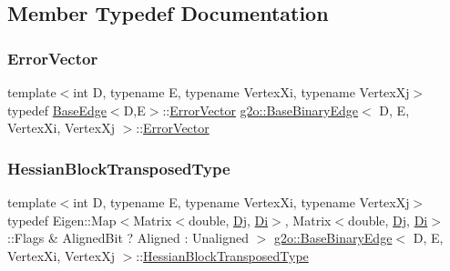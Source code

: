 \subsection{Member Typedef Documentation}
\mbox{\label{classg2o_1_1_base_binary_edge_ae1cccf6068b2446ece316b6a69a46acf}} 
\subsubsection{\texorpdfstring{Error\+Vector}{ErrorVector}}
{\footnotesize\ttfamily template$<$int D, typename E, typename Vertex\+Xi, typename Vertex\+Xj$>$ \\
typedef \mbox{\hyperlink{classg2o_1_1_base_edge}{Base\+Edge}}$<$D,E$>$\+::\mbox{\hyperlink{classg2o_1_1_base_binary_edge_ae1cccf6068b2446ece316b6a69a46acf}{Error\+Vector}} \mbox{\hyperlink{classg2o_1_1_base_binary_edge}{g2o\+::\+Base\+Binary\+Edge}}$<$ D, E, Vertex\+Xi, Vertex\+Xj $>$\+::\mbox{\hyperlink{classg2o_1_1_base_binary_edge_ae1cccf6068b2446ece316b6a69a46acf}{Error\+Vector}}}

\mbox{\label{classg2o_1_1_base_binary_edge_aec0d5b1819f702b7658574fcd6324b49}} 
\subsubsection{\texorpdfstring{Hessian\+Block\+Transposed\+Type}{HessianBlockTransposedType}}
{\footnotesize\ttfamily template$<$int D, typename E, typename Vertex\+Xi, typename Vertex\+Xj$>$ \\
typedef Eigen\+::\+Map$<$Matrix$<$double, \mbox{\hyperlink{classg2o_1_1_base_binary_edge_ab718b94950a34d589371fe6f5583b259}{Dj}}, \mbox{\hyperlink{classg2o_1_1_base_binary_edge_abfe232196405a7204bc299a747c1cc8b}{Di}}$>$, Matrix$<$double, \mbox{\hyperlink{classg2o_1_1_base_binary_edge_ab718b94950a34d589371fe6f5583b259}{Dj}}, \mbox{\hyperlink{classg2o_1_1_base_binary_edge_abfe232196405a7204bc299a747c1cc8b}{Di}}$>$\+::Flags \& Aligned\+Bit ? Aligned \+: Unaligned $>$ \mbox{\hyperlink{classg2o_1_1_base_binary_edge}{g2o\+::\+Base\+Binary\+Edge}}$<$ D, E, Vertex\+Xi, Vertex\+Xj $>$\+::\mbox{\hyperlink{classg2o_1_1_base_binary_edge_aec0d5b1819f702b7658574fcd6324b49}{Hessian\+Block\+Transposed\+Type}}}

